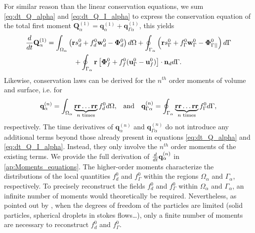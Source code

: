 For similar reason than the linear conservation equations, we sum \ref{eq:dt_Q_alpha} and \ref{eq:dt_Q_I_alpha} to express the conservation equation of the total first moment $\textbf{Q}^{(1)}_\alpha = \textbf{q}^{(1)}_\alpha + \textbf{q}^{(1)}_{\Gamma\alpha}$, this yields 
\begin{multline}
    \ddt {\textbf{Q}^{(1)}_\alpha}
    = \intO{ \left(
        \textbf{r} s_d^0         
        + f_d^0  \textbf{w}_d^0 
        - \mathbf{\Phi}_d^0
    \right) }
    + \intS{ \left(
        \textbf{r}s_\Gamma^0
        + f_\Gamma^0 \textbf{w}_\Gamma^0
        - \mathbf{\Phi}_{\Gamma||}^0
    \right) } \\
    + \intS{ \textbf{r} \left[
        \mathbf{\Phi}_f^0
        + f_f^0 (\textbf{u}_\Gamma^0-\textbf{u}_f^0)
    \right]\cdot \textbf{n}_d  }. 
    \label{eq:dt_Q_alpha_tot}
\end{multline}
Likewise, conservation laws can be derived for the $n^{th}$ order moments of volume and surface, i.e. for
\begin{align}
    \textbf{q}^{(n)}_{\alpha}
    = \intO{
         \underbrace{\textbf{rr}\ldots \textbf{rr}}_{n\text{ times}}
        f_d^0 },
        && \text{and} &&
    \textbf{q}^{(n)}_{\Gamma\alpha}
    = \intS{
         \underbrace{\textbf{rr}\ldots \textbf{rr}}_{n\text{ times}}
    f_\Gamma^0 },
    \label{eq:Q_n_definition}
\end{align} 
respectively. The time derivatives of $\textbf{q}^{(n)}_{\alpha}$ and $\textbf{q}^{(n)}_{\Gamma\alpha}$ do not introduce any additional terms beyond those already present in equations \ref{eq:dt_Q_alpha} and \ref{eq:dt_Q_I_alpha}.
Instead, they only involve the $n^{th}$ order moments of the existing terms.
We provide the full derivation of $\frac{d}{dt}{ \textbf{q}^{(n)}_{\alpha}}$ in \ref{ap:Moments_equations}.
The higher-order moments characterize the distributions of the local quantities $f_d^0$ and $f_\Gamma^0$ within the regions $\Omega_\alpha$ and $\Gamma_\alpha$​, respectively. 
To precisely reconstruct the fields $f_d^0$ and $f_\Gamma^0$ within $\Omega_\alpha$ and $\Gamma_\alpha$​, an infinite number of moments would theoretically be required. 
Nevertheless, as pointed out by \citet[Appendix A]{zhang1997momentum}, when the degrees of freedom of the particles are limited (solid particles, spherical droplets in stokes flows\ldots), only a finite number of moments are necessary to reconstruct $f_d^0$ and $f_\Gamma^0$. 
